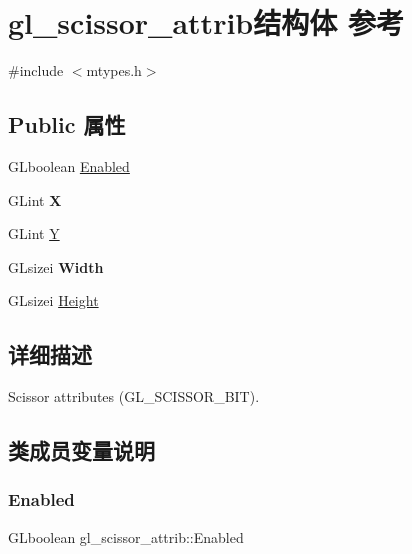 \hypertarget{structgl__scissor__attrib}{}\section{gl\+\_\+scissor\+\_\+attrib结构体 参考}
\label{structgl__scissor__attrib}


{\ttfamily \#include $<$mtypes.\+h$>$}

\subsection*{Public 属性}
\begin{DoxyCompactItemize}
\item 
G\+Lboolean \hyperlink{structgl__scissor__attrib_a0ec9d20f98de583379d758b2b3a04a8f}{Enabled}
\item 
\mbox{\label{structgl__scissor__attrib_a00f0466aaf9e90b785aea2b9bc98c800}} 
G\+Lint {\bfseries X}
\item 
G\+Lint \hyperlink{structgl__scissor__attrib_a65c3ae2843074b6c5f954fb26fba70c1}{Y}
\item 
\mbox{\label{structgl__scissor__attrib_afbdd991509821b841c4453d88656be5d}} 
G\+Lsizei {\bfseries Width}
\item 
G\+Lsizei \hyperlink{structgl__scissor__attrib_a180c6ba85469cd6bc737ab2e39d106ec}{Height}
\end{DoxyCompactItemize}


\subsection{详细描述}
Scissor attributes (G\+L\+\_\+\+S\+C\+I\+S\+S\+O\+R\+\_\+\+B\+IT). 

\subsection{类成员变量说明}
\mbox{\label{structgl__scissor__attrib_a0ec9d20f98de583379d758b2b3a04a8f}} 
\subsubsection{\texorpdfstring{Enabled}{Enabled}}
{\footnotesize\ttfamily G\+Lboolean gl\+\_\+scissor\+\_\+attrib\+::\+Enabled}

